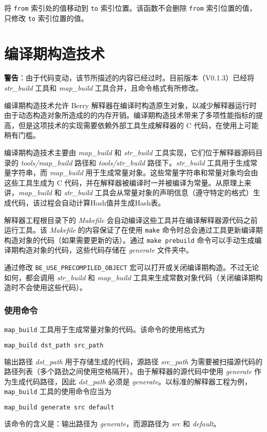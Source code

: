 将 \texttt{from} 索引处的值移动到 \texttt{to} 索引位置。该函数不会删除 \texttt{from} 索引位置的值，只修改 \texttt{to} 索引位置的值。


\section{编译期构造技术} \label{section::precompiled_build}

\textbf{警告}：由于代码变动，该节所描述的内容已经过时。目前版本（V0.1.3）已经将 \textsl{str\_build} 工具和 \textsl{map\_build} 工具合并，且命令格式有所修改。

编译期构造技术允许 Berry 解释器在编译时构造原生对象，以减少解释器运行时由于动态构造对象所造成的的内存开销。编译期构造技术带来了多项性能指标的提高，但是这项技术的实现需要依赖外部工具生成解释器的 C 代码，在使用上可能稍有门槛。

编译期构造技术主要由 \textsl{map\_build} 和 \textsl{str\_build} 工具实现，它们位于解释器源码目录的 \textsl{tools/map\_build} 路径和 \textsl{tools/str\_build} 路径下。\textsl{str\_build} 工具用于生成常量字符串，而 \textsl{map\_build} 用于生成常量对象。这些常量字符串和常量对象均会由这些工具生成为 C 代码，并在解释器被编译时一并被编译为常量。从原理上来讲，\textsl{map\_build} 和 \textsl{str\_build} 工具会从常量对象的声明信息（遵守特定的格式）生成代码，该过程会自动计算Hash值并生成Hash表。

解释器工程根目录下的 \textsl{Makefile} 会自动编译这些工具并在编译解释器源代码之前运行工具。该 \textsl{Makefile} 的内容保证了在使用 \texttt{make} 命令时总会通过工具更新编译期构造对象的代码（如果需要更新的话）。通过 \texttt{make prebuild} 命令可以手动生成编译期构造对象的代码，这些代码存储在 \textsl{generate} 文件夹中。

通过修改 \texttt{BE\_USE\_PRECOMPILED\_OBJECT} 宏可以打开或关闭编译期构造。不过无论如何，都会调用 \textsl{str\_build} 和 \textsl{map\_build} 工具来生成常数对象代码（关闭编译期构造时不会使用这些代码）。

\subsubsection{使用命令}

\texttt{map\_build} 工具用于生成常量对象的代码。该命令的使用格式为
\begin{lstlisting}[language=bash, numbers=none]
map_build dst_path src_path
\end{lstlisting}
输出路径 \textsl{dst\_path} 用于存储生成的代码，源路径 \textsl{src\_path} 为需要被扫描源代码的路径列表（多个路劲之间使用空格隔开）。由于解释器的源代码中使用 \textsl{generate} 作为生成代码路径，因此 \textsl{dst\_path} 必须是 \textsl{generate}。以标准的解释器工程为例，\texttt{map\_build} 工具的使用命令应当为
\begin{lstlisting}[language=bash, numbers=none]
map_build generate src default
\end{lstlisting}
该命令的含义是：输出路径为 \textsl{generate}，而源路径为 \textsl{src} 和 \textsl{default}。

